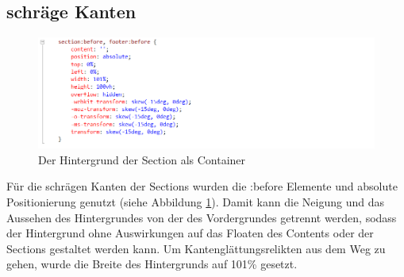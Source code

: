 \subsection{schräge Kanten}
\begin{figure} [h]
\includegraphics[width=\textwidth]{./img/css_secbefore.png}
\caption{Der Hintergrund der Section als Container}
\label{css_secbefore}
\end{figure}
Für die schrägen Kanten der Sections wurden die :before Elemente und absolute Positionierung genutzt (siehe Abbildung \ref{css_secbefore}). Damit kann die Neigung und das Aussehen des Hintergrundes von der des Vordergrundes getrennt werden, sodass der Hintergrund ohne Auswirkungen auf das Floaten des Contents oder der Sections gestaltet werden kann. Um Kantenglättungsrelikten aus dem Weg zu gehen, wurde die Breite des Hintergrunds auf 101\% gesetzt.
